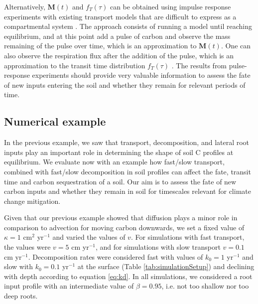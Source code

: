 \documentclass[11pt, oneside, a4paper]{article}   	%
\begin{document}
Alternatively, $\bm{M}(t)$ and $f_T(\tau)$ can be obtained using impulse response experiments with existing transport models that are difficult to express as a compartmental system \citep{Thompson1999, Metzler2018MG}. The approach consists of running a model until reaching equilibrium, and at this point add a pulse of carbon and observe the mass remaining of the pulse over time, which is an approximation to $\bm{M}(t) $. One can also observe the respiration flux after the addition of the pulse, which is an approximation to the transit time distribution $f_T(\tau)$ \citep{Metzler2018MG}. The results from pulse-response experiments should provide very valuable information to assess the fate of new inputs entering the soil and whether they remain for relevant periods of time. 



\subsection{Numerical example}
In the previous example, we saw that transport, decomposition, and lateral root inputs play an important role in determining the shape of soil C profiles at equilibrium. We evaluate now with an example how fast/slow transport, combined with fast/slow decomposition in soil profiles can affect the fate, transit time and carbon sequestration of a soil. Our aim is to assess the fate of new carbon inputs and whether they remain in soil for timescales relevant for climate change mitigation.

Given that our previous example showed that diffusion plays a minor role in comparison to advection for moving carbon downwards, we set a fixed value of $\kappa = 1$ cm$^2$ yr$^{-1}$ and varied the values of $v$. For simulations with fast transport, the values were $v = 5$ cm yr$^{-1}$, and for simulations with slow transport $v = 0.1$ cm yr$^{-1}$. Decomposition rates were considered fast with values of $k_0 = 1$ yr$^{-1}$ and slow with $k_0 = 0.1$ yr$^{-1}$ at the surface (Table \ref{tab:simulationSetup}) and declining with depth according to equation \ref{eq:kd}. In all simulations, we considered a root input profile with an intermediate value of $\beta = 0.95$, i.e. not too shallow nor too deep roots. 
\end{document}

